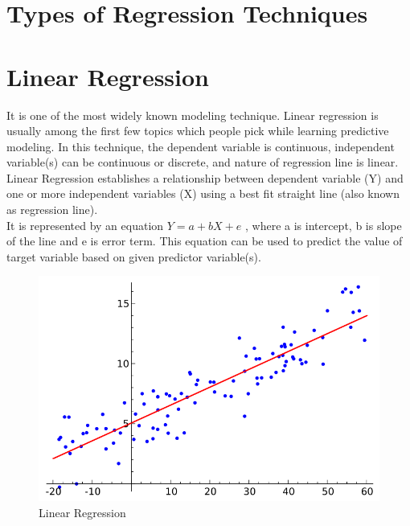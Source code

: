 \documentclass[11pt, a4paper]{report}
\begin{document}

\section*{Types of Regression Techniques}

\section{Linear Regression}

It is one of the most widely known modeling technique. Linear regression is usually among the first few topics which people pick while learning predictive modeling. In this technique, the dependent variable is continuous, independent variable(s) can be continuous or discrete, and nature of regression line is linear. \\

Linear Regression establishes a relationship between dependent variable (Y) and one or more independent variables (X) using a best fit straight line (also known as regression line). \\

It is represented by an equation $ Y=a+bX + e $ , where a is intercept, b is slope of the line and e is error term. This equation can be used to predict the value of target variable based on given predictor variable(s).

\begin{figure}[!bth]
	\center
	\includegraphics[scale=0.4]{images/Linear_regression}
	\caption[Linear Regression]{Linear Regression \cite{wiki:LinearRegression}}
	\label{fig:linearRegression}
\end{figure}
\end{document}
